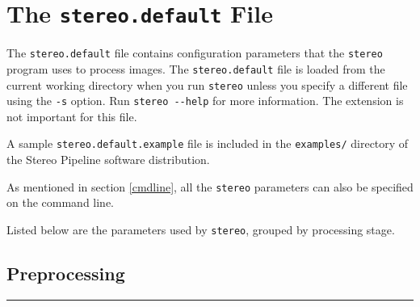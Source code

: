 \chapter{The {\tt stereo.default} File}
\label{ch:stereodefault}

The \texttt{stereo.default} file contains configuration parameters
that the \texttt{stereo} program uses to process images.  The
\texttt{stereo.default} file is loaded from the current working
directory when you run \texttt{stereo} unless you specify a different
file using the \texttt{-s} option. Run \texttt{stereo -\/-help} for
more information. The extension is not important for this file.

A sample \texttt{stereo.default.example} file is included in the
\texttt{examples/} directory of the Stereo Pipeline software
distribution.

As mentioned in section \ref{cmdline}, all the \texttt{stereo} parameters can also be specified on the
command line.

Listed below are the parameters used by \texttt{stereo}, grouped by
processing stage.



\section{Preprocessing}
\label{stereo-default-preprocessing}
\hrule
\bigskip


